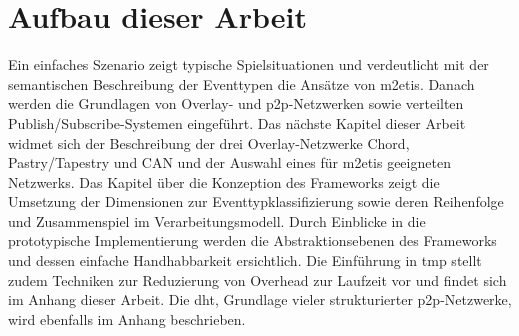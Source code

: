 \section*{Aufbau dieser Arbeit}
Ein einfaches Szenario zeigt typische Spielsituationen und verdeutlicht mit der semantischen Beschreibung der Eventtypen die Ansätze von \ac{m2etis}. Danach werden die Grundlagen von Overlay- und p2p-Netzwerken sowie verteilten Publish/Subscribe-Systemen eingeführt. Das nächste Kapitel dieser Arbeit widmet sich der Beschreibung der drei Overlay-Netzwerke Chord, Pastry/Tapestry und CAN und der Auswahl eines für \ac{m2etis} geeigneten Netzwerks. Das Kapitel über die Konzeption des Frameworks zeigt die Umsetzung der Dimensionen zur Eventtypklassifizierung sowie deren Reihenfolge und Zusammenspiel im Verarbeitungsmodell. Durch Einblicke in die prototypische Implementierung werden die Abstraktionsebenen des Frameworks und dessen einfache Handhabbarkeit ersichtlich. Die Einführung in \ac{tmp} stellt zudem Techniken zur Reduzierung von Overhead zur Laufzeit vor und findet sich im Anhang dieser Arbeit. Die \ac{dht}, Grundlage vieler strukturierter \ac{p2p}-Netzwerke, wird ebenfalls im Anhang beschrieben.
